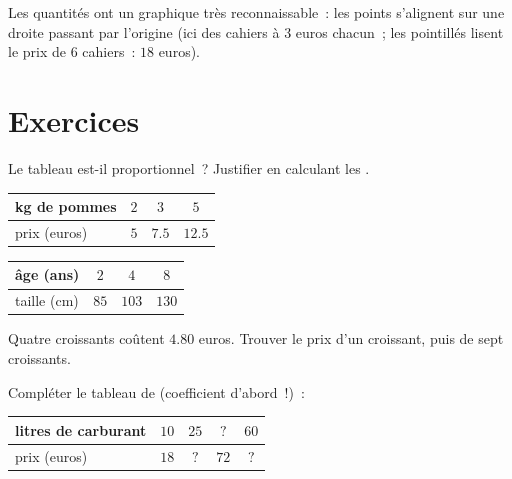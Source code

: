 \begin{omfigure}

{\small Les quantités  ont un graphique très
reconnaissable~: les points s'alignent sur une droite passant par
l'origine (ici des cahiers à $3$ euros chacun~; les pointillés lisent
le prix de $6$ cahiers~: $18$ euros).}
\end{omfigure}

\section{Exercices}

\begin{exercise}[$\star$]\label{exo:g6:propdata:1}
Le tableau est-il proportionnel~? Justifier en calculant les
.
\begin{center}
\renewcommand{\arraystretch}{1.2}
\begin{tabular}{l|ccc}
kg de pommes & $2$ & $3$ & $5$ \\
\hline
prix (euros) & $5$ & $7.5$ & $12.5$ \\
\end{tabular}
\qquad
\begin{tabular}{l|ccc}
âge (ans) & $2$ & $4$ & $8$ \\
\hline
taille (cm) & $85$ & $103$ & $130$ \\
\end{tabular}
\end{center}
\end{exercise}

\begin{exercise}[$\star$]\label{exo:g6:propdata:2}
Quatre croissants coûtent $4.80$ euros. Trouver le prix d'un
croissant, puis de sept croissants.
\end{exercise}

\begin{exercise}[$\star$]\label{exo:g6:propdata:3}
Compléter le tableau de  (coefficient d'abord~!)~:
\begin{center}
\renewcommand{\arraystretch}{1.2}
\begin{tabular}{l|cccc}
litres de carburant & $10$ & $25$ & $?$ & $60$ \\
\hline
prix (euros) & $18$ & $?$ & $72$ & $?$ \\
\end{tabular}
\end{center}
\end{exercise}

